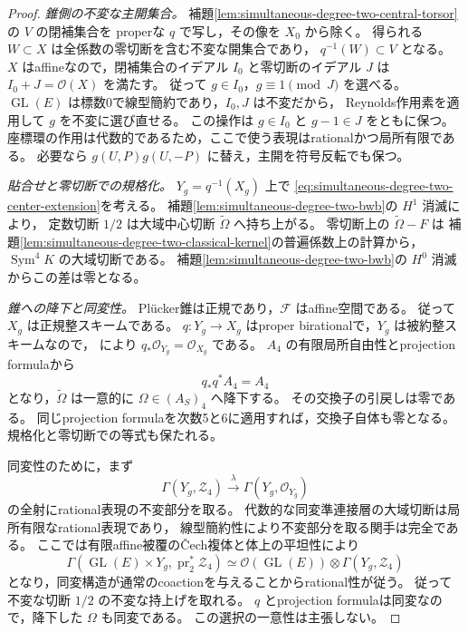 \begin{proof}
\emph{錐側の不変な主開集合。}
補題\ref{lem:simultaneous-degree-two-central-torsor}の $V$ の閉補集合を
properな $q$ で写し，その像を $X_0$ から除く。
得られる $W\subset X$ は全係数の零切断を含む不変な開集合であり，
$q^{-1}(W)\subset V$ となる。
$X$ はaffineなので，閉補集合のイデアル $I_0$ と零切断のイデアル $J$ は
$I_0+J=\mathcal O(X)$ を満たす。
従って $g\in I_0$，$g\equiv1\pmod J$ を選べる。
$\operatorname{GL}(E)$ は標数0で線型簡約であり，$I_0,J$ は不変だから，
Reynolds作用素を適用して $g$ を不変に選び直せる。
この操作は $g\in I_0$ と $g-1\in J$ をともに保つ。
座標環の作用は代数的であるため，ここで使う表現はrationalかつ局所有限である。
必要なら $g(U,P)g(U,-P)$ に替え，主開を符号反転でも保つ。

\emph{貼合せと零切断での規格化。}
$Y_g=q^{-1}(X_g)$ 上で
\eqref{eq:simultaneous-degree-two-center-extension}を考える。
補題\ref{lem:simultaneous-degree-two-bwb}の $H^1$ 消滅により，
定数切断 $1/2$ は大域中心切断 $\widetilde\Omega$ へ持ち上がる。
零切断上の $\widetilde\Omega-F$ は
補題\ref{lem:simultaneous-degree-two-classical-kernel}の普遍係数上の計算から，
$\operatorname{Sym}^4K$ の大域切断である。
補題\ref{lem:simultaneous-degree-two-bwb}の $H^0$ 消滅からこの差は零となる。

\emph{錐への降下と同変性。}
Pl\"ucker錐は正規であり，$\mathcal F$ はaffine空間である。
従って $X_g$ は正規整スキームである。
$q:Y_g\to X_g$ はproper birationalで，$Y_g$ は被約整スキームなので，
\cite[Tag~0AY8, Lemma~37.53.6]{StacksProject}により
$q_*\mathcal O_{Y_g}=\mathcal O_{X_g}$ である。
$A_4$ の有限局所自由性とprojection formulaから
\[
 q_*q^*A_4=A_4
\]
となり，$\widetilde\Omega$ は一意的に $\Omega\in(A_S)_4$ へ降下する。
その交換子の引戻しは零である。
同じprojection formulaを次数5と6に適用すれば，交換子自体も零となる。
規格化と零切断での等式も保たれる。

同変性のために，まず
\[
 \Gamma(Y_g,\mathcal Z_4)\xrightarrow{\lambda}
 \Gamma(Y_g,\mathcal O_{Y_g})
\]
の全射にrational表現の不変部分を取る。
代数的な同変準連接層の大域切断は局所有限なrational表現であり，
線型簡約性により不変部分を取る関手は完全である。
ここでは有限affine被覆の\v{C}ech複体と体上の平坦性により
\[
 \Gamma(\operatorname{GL}(E)\times Y_g,\operatorname{pr}_2^*\mathcal Z_4)
 \simeq\mathcal O(\operatorname{GL}(E))\otimes\Gamma(Y_g,\mathcal Z_4)
\]
となり，同変構造が通常のcoactionを与えることからrational性が従う。
従って不変な切断 $1/2$ の不変な持上げを取れる。
$q$ とprojection formulaは同変なので，降下した $\Omega$ も同変である。
この選択の一意性は主張しない。


\end{proof}
